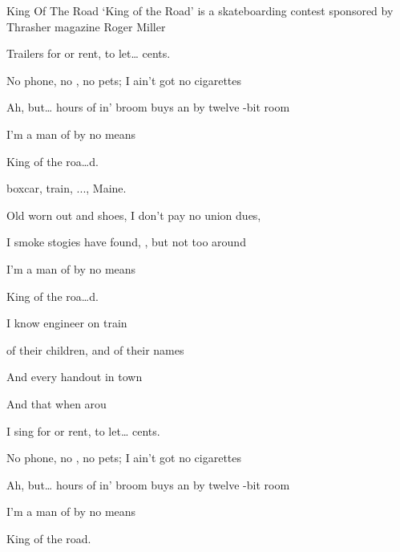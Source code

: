\begin{SBSong}{King Of The Road}
  {`King of the Road' is a skateboarding contest sponsored by Thrasher magazine}
  {Roger Miller}
  \begin{SBVerse}
    Trailers for  or rent,  to let\ldots {} cents.

    No phone, no , no pets;   I ain't got no cigarettes

    Ah, but\ldots {} hours of in' broom buys an  by twelve -bit room

    I'm a man of  by no means    

    King of the roa\ldots d.
  \end{SBVerse}
  \begin{SBVerse}
     boxcar,  train, ..., Maine.

    Old worn out  and shoes,   I don't pay no union dues,

    I smoke  stogies  have found, , but not too  around

    I'm a man of  by no means    

    King of the roa\ldots d.
  \end{SBVerse}
  \begin{SBVerse}
    I know  engineer on  train

     of their children, and  of their names

    And every handout in  town

    And   that   when   arou 
  \end{SBVerse}
  \begin{SBVerse}
    I sing  for  or rent,  to let\ldots {} cents.

    No phone, no , no pets;   I ain't got no cigarettes

    Ah, but\ldots {} hours of in' broom buys an  by twelve -bit room

    I'm a man of  by no means 

      King of the road.
  \end{SBVerse}
\end{SBSong}
